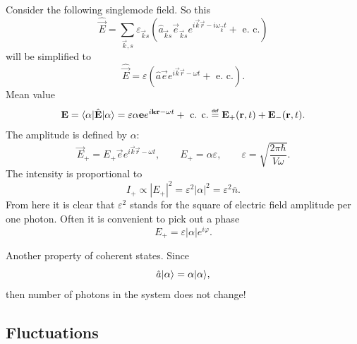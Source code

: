 Consider the following singlemode field. So this
\begin{equation}
	\hat{\vec{E}} = \sum_{\vec{k},s} \varepsilon_{\vec{k}s} \left( \hat{a}_{\vec{k}s} \vec{e}_{\vec{k}s} e^{i \vec{k} \vec{r} - i \omega_{\vec{k}}t} + \text{ e. c.} \right)
\end{equation}
will be simplified to
\begin{equation}
	\hat{\vec{E}} = \varepsilon \left( \hat{a} \vec{e} e^{i \vec{k} \vec{r} - \omega t} + \text{ e. c.}\right).
\end{equation}
Mean value 
\begin{equation}
	\vec{E} = \bra{\alpha} \hat{\vec{E}} \ket{\alpha} = \varepsilon \alpha \vec{e} e^{i \vec{k} \vec{r} - \omega t} + \text{ c. c.} \myeq \vec{E}_+(\vec{r},t) + \vec{E}_-(\vec{r},t).
\end{equation}
The amplitude is defined by $\alpha$:
\begin{equation}
	\vec{E}_+ = E_+ \vec{e} e^{i \vec{k} \vec{r} - \omega t}, \qquad E_+ = \alpha \varepsilon, \qquad \varepsilon = \sqrt{\frac{2 \pi \hbar}{V \omega}}.
\end{equation}
The intensity is proportional to
\begin{equation}
	I_+ \propto \left|E_+\right|^2 = \varepsilon^2 \left|\alpha\right|^2 = \varepsilon^2 \overline{n}.
\end{equation}
From here it is clear that $\varepsilon^2$ stands for the square of electric field amplitude per one photon. Often it is convenient to pick out a phase
\begin{equation}
	E_+ = \varepsilon \left|\alpha\right| e^{i \varphi}.
\end{equation}

Another property of coherent states. Since 
\begin{equation}
	\hat{a} \lvert\alpha\rangle = \alpha \lvert\alpha\rangle,
\end{equation}
then number of photons in the system does not change!


\subsection{Fluctuations}

